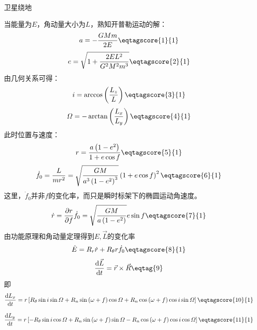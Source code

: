 \documentclass[answer]{cphos}
\begin{document}
\begin{problem}[50]{卫星绕地}
\begin{solution}
当能量为$E$，角动量大小为$L$，熟知开普勒运动的解：
\begin{equation}
	a=-\frac{GMm}{2E} \eqtagscore{1}{1} 
\end{equation}
\begin{equation}
	e=\sqrt{1+\frac{2EL^2}{G^2M^2m^3}} \eqtagscore{2}{1}
\end{equation}
由几何关系可得：
\begin{equation}
	i=\arccos\left(\frac{L_z}{L}\right) \eqtagscore{3}{1}
\end{equation}
\begin{equation}
	\varOmega=-\arctan\left(\frac{L_x}{L_y}\right) \eqtagscore{4}{1}
\end{equation}
此时位置与速度：
\begin{equation}
	r=\frac{a\left(1-e^2\right)}{1+e\cos f} \eqtagscore{5}{1}
\end{equation}
\begin{equation}
	\dot{f}_0=\frac{L}{mr^2}=\sqrt{\frac{GM}{a^3\left(1-e^2\right)^3}}\left(1+e\cos f\right)^2 \eqtagscore{6}{1}
\end{equation}
这里，$\dot{f}_0$并非$f$的变化率，而只是瞬时标架下的椭圆运动角速度。
\begin{equation}
	\dot{r}=\frac{\partial{r}}{\partial{f}}\dot{f}_0=\sqrt{\frac{GM}{a\left(1-e^2\right)}}e\sin f \eqtagscore{7}{1}
\end{equation}
由功能原理和角动量定理得到$E, \vec L$的变化率
\begin{equation}
	\dot{E}=R_{r}\dot{r}+R_{\theta}r\dot{f}_0 \eqtagscore{8}{1}
\end{equation}
\begin{equation}
	\frac{\mathrm{d}\vec{L}}{\mathrm{d}t}=\vec{r}\times\vec{R}  \eqtag{9}
\end{equation}
即
\begin{equation}
	\frac{\mathrm{d}L_x}{\mathrm{d}t} = r\left[R_\theta \sin i \sin \varOmega + R_n \sin\left(\omega + f\right) \cos \varOmega + R_n \cos\left(\omega + f\right) \cos i \sin \varOmega\right] \eqtagscore{10}{1}
\end{equation}

\begin{equation}
	\frac{\mathrm{d}L_y}{\mathrm{d}t} = r\left[-R_\theta \sin i \cos \varOmega + R_n \sin\left(\omega + f\right) \sin \varOmega - R_n \cos\left(\omega + f\right) \cos i \cos \varOmega\right] \eqtagscore{11}{1}
\end{equation}


\end{solution}
\end{problem}
\end{document}
